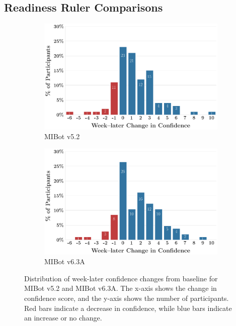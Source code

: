 \subsection{Readiness Ruler Comparisons}
\begin{figure}[htbp]
    \centering
    \begin{subfigure}[b]{0.48\textwidth}
        \centering
        \includegraphics[width=\textwidth]{fig/MIV5.2_ruler_deltas_delta_with_week_later_keep_high_conf_False_change.png}
        \caption{MIBot v5.2}
        \label{fig:confidence_v5.2}
    \end{subfigure}
    \hfill
    \begin{subfigure}[b]{0.48\textwidth}
        \centering
        \includegraphics[width=\textwidth]{fig/2024-11-14-MIV6.3A-2024-11-22-MIV6.3A_ruler_deltas_delta_with_week_later_keep_high_conf_False_change.png}
        \caption{MIBot v6.3A}
        \label{fig:confidence_v6.3}
    \end{subfigure}

    
    \caption[Confidence Change Distributions for MIBot v5.2 and v6.3A]{Distribution of week-later confidence changes from baseline for MIBot v5.2 and MIBot v6.3A. The x-axis shows the change in confidence score, and the y-axis shows the number of participants. Red bars indicate a decrease in confidence, while blue bars indicate an increase or no change.}
    \label{fig:confidence_distributions}
\end{figure}










